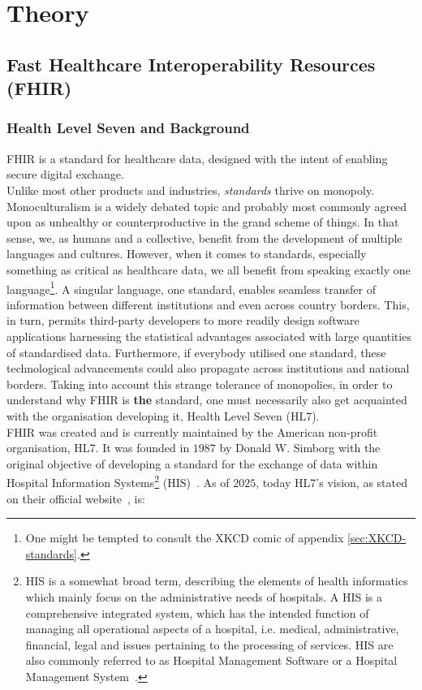 \section{Theory}\label{sec:theory}
\subsection{Fast Healthcare Interoperability Resources (FHIR)}
\subsubsection*{Health Level Seven and Background}
FHIR is a standard for healthcare data, designed with the intent of enabling secure digital exchange.
\\
Unlike most other products and industries, \emph{standards} thrive on monopoly. Monoculturalism is a widely debated topic and probably most commonly agreed upon as unhealthy or counterproductive in the grand scheme of things. In that sense, we, as humans and a collective, benefit from the development of multiple languages and cultures. However, when it comes to standards, especially something as critical as healthcare data, we all benefit from speaking exactly one language\footnote{One might be tempted to consult the XKCD comic of appendix \autoref{sec:XKCD-standards}.}. A singular language, one standard, enables seamless transfer of information between different institutions and even across country borders. This, in turn, permits third-party developers to more readily design software applications harnessing the statistical advantages associated with large quantities of standardised data. Furthermore, if everybody utilised one standard, these technological advancements could also propagate across institutions and national borders. Taking into account this strange tolerance of monopolies, in order to understand why FHIR is \textbf{the} standard, one must necessarily also get acquainted with the organisation developing it, Health Level Seven (HL7).
\\
FHIR was created and is currently maintained by the American non-profit organisation, HL7. It was founded in $1987$ by Donald W. Simborg with the original objective of developing a standard for the exchange of data within Hospital Information Systems\footnote{HIS is a somewhat broad term, describing the elements of health informatics which mainly focus on the administrative needs of hospitals. A HIS is a comprehensive integrated system, which has the intended function of managing all operational aspects of a hospital, i.e. medical, administrative, financial, legal and issues pertaining to the processing of services. HIS are also commonly referred to as Hospital Management Software or a Hospital Management System~\cite{Wiki-HIS}.} (HIS)~\cite{Wiki-HL7}. As of $2025$, today HL7's vision, as stated on their official website~\cite{HL7-about}, is:
